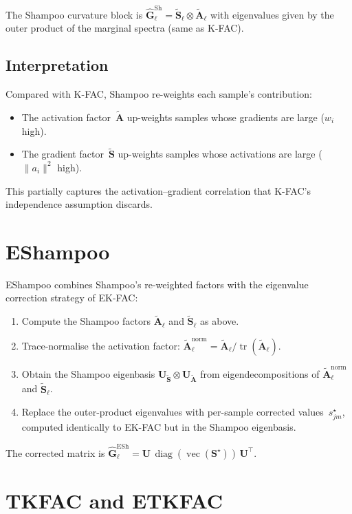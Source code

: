 \documentclass[11pt]{article}
\DeclareMathOperator{\diag}{diag}
\DeclareMathOperator{\tr}{tr}
\DeclareMathOperator{\vect}{vec}
\newcommand{\kron}{\otimes}
\begin{document}
The Shampoo curvature block is
$\hat{\mathbf{G}}_\ell^{\text{Sh}}
= \tilde{\mathbf{S}}_\ell \kron \tilde{\mathbf{A}}_\ell$
with eigenvalues given by the outer product of the marginal spectra
(same as K-FAC).

\subsection{Interpretation}

Compared with K-FAC, Shampoo re-weights each sample's contribution:
\begin{itemize}
\item The activation factor~$\tilde{\mathbf{A}}$ up-weights samples
  whose gradients are large ($w_i$ high).
\item The gradient factor~$\tilde{\mathbf{S}}$ up-weights samples
  whose activations are large ($\|a_i\|^2$ high).
\end{itemize}
This partially captures the activation--gradient correlation that
K-FAC's independence assumption discards.

\section{EShampoo}

EShampoo combines Shampoo's re-weighted factors with the eigenvalue
correction strategy of EK-FAC:
\begin{enumerate}
\item Compute the Shampoo factors $\tilde{\mathbf{A}}_\ell$ and
  $\tilde{\mathbf{S}}_\ell$ as above.
\item Trace-normalise the activation factor:
  $\tilde{\mathbf{A}}_\ell^{\text{norm}}
  = \tilde{\mathbf{A}}_\ell / \tr(\tilde{\mathbf{A}}_\ell)$.
\item Obtain the Shampoo eigenbasis
  $\mathbf{U}_{\tilde{\mathbf{S}}} \kron
   \mathbf{U}_{\tilde{\mathbf{A}}}$
  from eigendecompositions of
  $\tilde{\mathbf{A}}_\ell^{\text{norm}}$ and
  $\tilde{\mathbf{S}}_\ell$.
\item Replace the outer-product eigenvalues with per-sample
  corrected values~$s^\star_{jm}$, computed identically to
  EK-FAC but in the Shampoo eigenbasis.
\end{enumerate}
The corrected matrix is
$\hat{\mathbf{G}}_\ell^{\text{ESh}}
= \mathbf{U}\,\diag(\vect(\mathbf{S}^\star))\,\mathbf{U}^\top$.

\section{TKFAC and ETKFAC}
\end{document}
